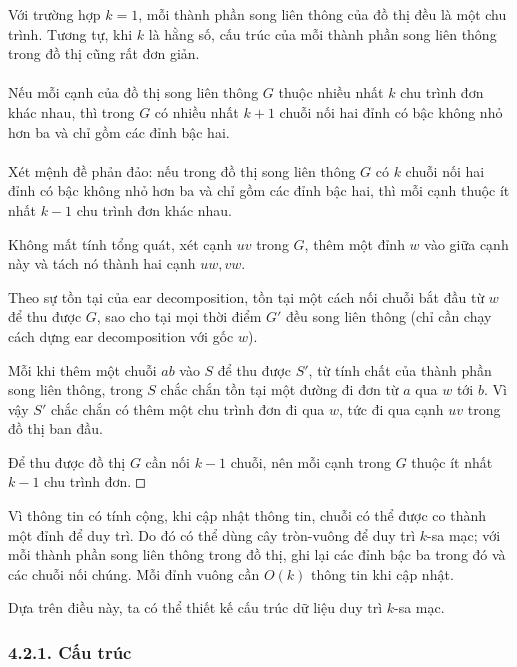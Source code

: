 \documentclass[11pt]{article}
\newcommand{\square}{\mathord{\vcenter{\hrule height .5pt
  \hbox{\vrule width .5pt height 5pt\kern5pt\vrule width .5pt}
  \hrule height .5pt}}}
\begin{document}
Với trường hợp \(k=1\), mỗi thành phần song liên thông của đồ thị đều là một
chu trình. Tương tự, khi \(k\) là hằng số, cấu trúc của mỗi thành phần song
liên thông trong đồ thị cũng rất đơn giản.

\paragraph{}
Nếu mỗi cạnh của đồ thị song liên thông \(G\) thuộc nhiều nhất \(k\) chu
trình đơn khác nhau, thì trong \(G\) có nhiều nhất \(k+1\) chuỗi nối hai đỉnh
có bậc không nhỏ hơn ba và chỉ gồm các đỉnh bậc hai.

\paragraph{}
Xét mệnh đề phản đảo: nếu trong đồ thị song liên thông \(G\) có \(k\) chuỗi
nối hai đỉnh có bậc không nhỏ hơn ba và chỉ gồm các đỉnh bậc hai, thì mỗi
cạnh thuộc ít nhất \(k-1\) chu trình đơn khác nhau.

Không mất tính tổng quát, xét cạnh \(uv\) trong \(G\), thêm một đỉnh \(w\)
vào giữa cạnh này và tách nó thành hai cạnh \(uw,vw\).

Theo sự tồn tại của ear decomposition, tồn tại một cách nối chuỗi bắt đầu từ
\(w\) để thu được \(G\), sao cho tại mọi thời điểm \(G'\) đều song liên thông
(chỉ cần chạy cách dựng ear decomposition với gốc \(w\)).

Mỗi khi thêm một chuỗi \(ab\) vào \(S\) để thu được \(S'\), từ tính chất của
thành phần song liên thông, trong \(S\) chắc chắn tồn tại một đường đi đơn từ
\(a\) qua \(w\) tới \(b\). Vì vậy \(S'\) chắc chắn có thêm một chu trình đơn
đi qua \(w\), tức đi qua cạnh \(uv\) trong đồ thị ban đầu.

Để thu được đồ thị \(G\) cần nối \(k-1\) chuỗi, nên mỗi cạnh trong \(G\)
thuộc ít nhất \(k-1\) chu trình đơn. \(\square\)

Vì thông tin có tính cộng, khi cập nhật thông tin, chuỗi có thể được co thành
một đỉnh để duy trì. Do đó có thể dùng cây tròn-vuông để duy trì
\(k\)-sa mạc; với mỗi thành phần song liên thông trong đồ thị, ghi lại các
đỉnh bậc ba trong đó và các chuỗi nối chúng. Mỗi đỉnh vuông cần \(O(k)\)
thông tin khi cập nhật.

Dựa trên điều này, ta có thể thiết kế cấu trúc dữ liệu duy trì \(k\)-sa mạc.

\subsubsection*{4.2.1. Cấu trúc}
\end{document}
